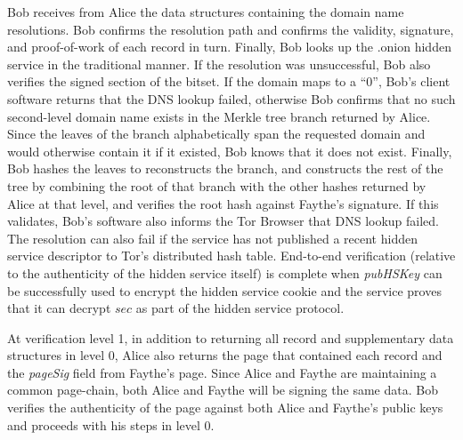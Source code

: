 Bob receives from Alice the data structures containing the domain name resolutions. Bob confirms the resolution path and confirms the validity, signature, and proof-of-work of each record in turn. Finally, Bob looks up the .onion hidden service in the traditional manner. If the resolution was unsuccessful, Bob also verifies the signed section of the bitset. If the domain maps to a ``0'', Bob's client software returns that the DNS lookup failed, otherwise Bob confirms that no such second-level domain name exists in the Merkle tree branch returned by Alice. Since the leaves of the branch alphabetically span the requested domain and would otherwise contain it if it existed, Bob knows that it does not exist. Finally, Bob hashes the leaves to reconstructs the branch, and constructs the rest of the tree by combining the root of that branch with the other hashes returned by Alice at that level, and verifies the root hash against Faythe's signature. If this validates, Bob's software also informs the Tor Browser that DNS lookup failed. The resolution can also fail if the service has not published a recent hidden service descriptor to Tor's distributed hash table. End-to-end verification (relative to the authenticity of the hidden service itself) is complete when \emph{pubHSKey} can be successfully used to encrypt the hidden service cookie and the service proves that it can decrypt $ sec $ as part of the hidden service protocol.


At verification level 1, in addition to returning all record and supplementary data structures in level 0, Alice also returns the page that contained each record and the \emph{pageSig} field from Faythe's page. Since Alice and Faythe are maintaining a common page-chain, both Alice and Faythe will be signing the same data. Bob verifies the authenticity of the page against both Alice and Faythe's public keys and proceeds with his steps in level 0.



